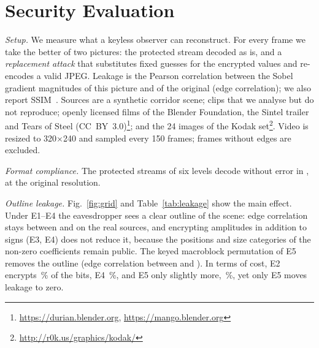 \documentclass{ieeeaccess}
\newif\ifextended
\begin{document}
\section{Security Evaluation}\label{sec:security}
\textit{Setup.} We measure what a keyless observer can reconstruct. For every frame we take the better of two pictures: the protected stream decoded as is, and a \emph{replacement attack} that substitutes fixed guesses for the encrypted values\ifextended{} (absolute values for encrypted signs, the smallest value of the size category for encrypted amplitudes, zero DC differences)\fi{} and re-encodes a valid JPEG. Leakage is the Pearson correlation between the Sobel gradient magnitudes of this picture and of the original (edge correlation); we also report SSIM~\cite{ssim}. Sources are a synthetic corridor scene; \NumClips{} clips that we analyse but do not reproduce\ifextended{} (two film trailers, two talking-head videos and a handheld phone video, identified by hash)\fi; \NumOpenClips{} openly licensed films of the Blender Foundation, the Sintel trailer and Tears of Steel (CC~BY~3.0)\footnote{\url{https://durian.blender.org}, \url{https://mango.blender.org}}; and the 24 images of the Kodak set\footnote{\url{http://r0k.us/graphics/kodak/}}. Video is resized to 320$\times$240 and sampled every 150 frames; frames without edges are excluded.

\textit{Format compliance.} The protected streams of \AllDecode{} six levels decode without error in \Decoders{}, at the original resolution.


\textit{Outline leakage.} Fig.~\ref{fig:grid} and Table~\ref{tab:leakage} show the main effect. Under E1--E4 the eavesdropper sees a clear outline of the scene: edge correlation stays between \LeakEOneFourMin{} and \LeakEOneFourMax{} on the real sources, and encrypting amplitudes in addition to signs (E3, E4) does not reduce it, because the positions and size categories of the non-zero coefficients remain public. The keyed macroblock permutation of E5 removes the outline (edge correlation between \LeakEFiveMin{} and \LeakEFiveMax{}). In terms of cost, E2 encrypts \CostEtwo\,\% of the bits, E4 \CostEfour\,\%, and E5 only slightly more, \CostEfive\,\%, yet only E5 moves leakage to zero.
\end{document}
